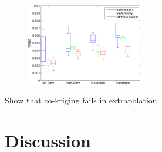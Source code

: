 \begin{figure}[!ht]
  \centering
        \includegraphics[width=0.45\textwidth]
        {images/part3/boxPlotsClAlphaAccuracyMeasure}
        \label{subFigboxPlotsClAlphaAccuracyMeasure}
       \caption{}
       \label{}
\end{figure}

Show that co-kriging fails in extrapolation


\section{Discussion}